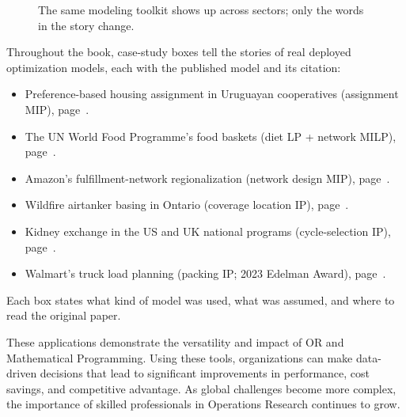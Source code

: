 \begin{figure}[h]
\centering
{}
\caption{The same modeling toolkit shows up across sectors; only the words in the story change.}
\label{fig:or-sectors}
\end{figure}

\begin{tcolorbox}[colback=blue!4!white, colframe=blue!55!black,
  title=\textbf{Case studies in this book}]
Throughout the book, case-study boxes tell the stories of real deployed
optimization models, each with the published model and its citation:
\begin{itemize}
\item Preference-based housing assignment in Uruguayan cooperatives (assignment MIP), page~\pageref{case:housing-uruguay}.
\item The UN World Food Programme's food baskets (diet LP + network MILP), page~\pageref{case:wfp}.
\item Amazon's fulfillment-network regionalization (network design MIP), page~\pageref{case:amazon-regionalization}.
\item Wildfire airtanker basing in Ontario (coverage location IP), page~\pageref{case:wildfire-airtankers}.
\item Kidney exchange in the US and UK national programs (cycle-selection IP), page~\pageref{case:kidney-exchange}.
\item Walmart's truck load planning (packing IP; 2023 Edelman Award), page~\pageref{case:walmart-loads}.
\end{itemize}
Each box states what kind of model was used, what was assumed, and where to
read the original paper.
\end{tcolorbox}

These applications demonstrate the versatility and impact of OR and Mathematical Programming. Using these tools, organizations can make data-driven decisions that lead to significant improvements in performance, cost savings, and competitive advantage. As global challenges become more complex, the importance of skilled professionals in Operations Research continues to grow.

